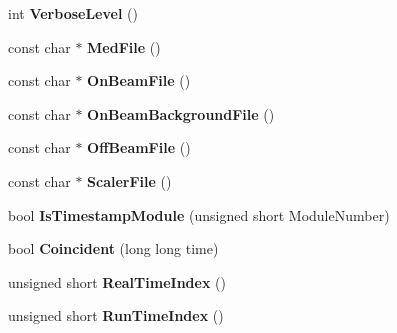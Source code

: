 \begin{DoxyCompactItemize}
\item 
\hypertarget{class_global_settings_a922a7140b177a6fc02509fe2e443732e}{int {\bfseries Verbose\-Level} ()}\label{class_global_settings_a922a7140b177a6fc02509fe2e443732e}

\item 
\hypertarget{class_global_settings_a76ba56132fe67495a9c5c3a041a48a08}{const char $\ast$ {\bfseries Med\-File} ()}\label{class_global_settings_a76ba56132fe67495a9c5c3a041a48a08}

\item 
\hypertarget{class_global_settings_adbe98db49b93666afb5d9cb76e671f79}{const char $\ast$ {\bfseries On\-Beam\-File} ()}\label{class_global_settings_adbe98db49b93666afb5d9cb76e671f79}

\item 
\hypertarget{class_global_settings_aeed9285f4c68b974c23a4db5d89f3ed5}{const char $\ast$ {\bfseries On\-Beam\-Background\-File} ()}\label{class_global_settings_aeed9285f4c68b974c23a4db5d89f3ed5}

\item 
\hypertarget{class_global_settings_a156b6901d18059153c65ee043b9077b2}{const char $\ast$ {\bfseries Off\-Beam\-File} ()}\label{class_global_settings_a156b6901d18059153c65ee043b9077b2}

\item 
\hypertarget{class_global_settings_a262856ae6329c24152ca5056e71f1f94}{const char $\ast$ {\bfseries Scaler\-File} ()}\label{class_global_settings_a262856ae6329c24152ca5056e71f1f94}

\item 
\hypertarget{class_global_settings_a1fd06f7b8b9818d1f86f290241d3c923}{bool {\bfseries Is\-Timestamp\-Module} (unsigned short Module\-Number)}\label{class_global_settings_a1fd06f7b8b9818d1f86f290241d3c923}

\item 
\hypertarget{class_global_settings_aaee3450f69d50e203651d31c2069955c}{bool {\bfseries Coincident} (long long time)}\label{class_global_settings_aaee3450f69d50e203651d31c2069955c}

\item 
\hypertarget{class_global_settings_a973a2930c1c9d1d3a5fffbeb0f91f1d2}{unsigned short {\bfseries Real\-Time\-Index} ()}\label{class_global_settings_a973a2930c1c9d1d3a5fffbeb0f91f1d2}

\item 
\hypertarget{class_global_settings_a8917b578821e73520f027890799cbc15}{unsigned short {\bfseries Run\-Time\-Index} ()}\label{class_global_settings_a8917b578821e73520f027890799cbc15}


\end{DoxyCompactItemize}
